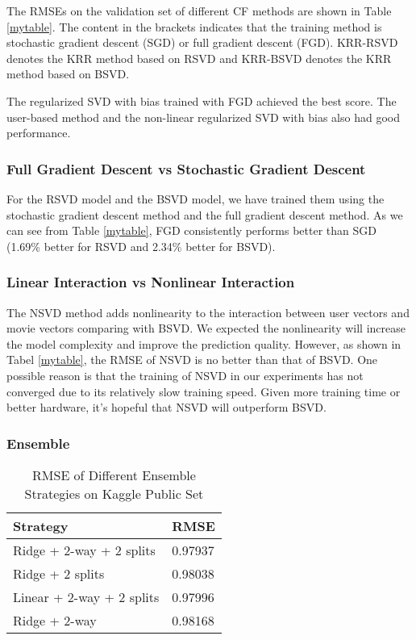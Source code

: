 \documentclass[10pt,conference,compsocconf]{IEEEtran}
\begin{document}
The RMSEs on the validation set of different CF methods are shown in Table \ref{mytable}. The content in the brackets indicates that the training method is stochastic gradient descent (SGD) or full gradient descent (FGD). KRR-RSVD denotes the KRR method based on RSVD and KRR-BSVD denotes the KRR method based on BSVD. 

The regularized SVD with bias trained with FGD achieved the best score. The user-based method and the non-linear regularized SVD with bias also had good performance.

\subsubsection{Full Gradient Descent vs Stochastic Gradient Descent}
For the RSVD model and the BSVD model, we have trained them using the stochastic gradient descent method and the full gradient descent method. As we can see from Table \ref{mytable}, FGD consistently performs better than SGD (1.69\% better for RSVD and 2.34\% better for BSVD).

\subsubsection{Linear Interaction vs Nonlinear Interaction}
The NSVD method adds nonlinearity to the interaction between user vectors and movie vectors comparing with BSVD. We expected the nonlinearity will increase the model complexity and improve the prediction quality. However, as shown in Tabel \ref{mytable}, the RMSE of NSVD is no better than that of BSVD. One possible reason is that the training of NSVD in our experiments has not converged due to its relatively slow training speed. Given more training time or better hardware, it's hopeful that NSVD will outperform BSVD.

\subsubsection{Ensemble}
\begin{table*}[htbp]
  \centering
  \begin{tabular}[c]{|l||l|}
    \hline
    Strategy&RMSE\\
    \hline
    Ridge + 2-way + 2 splits&0.97937\\
    Ridge + 2 splits&0.98038\\
    Linear + 2-way + 2 splits&0.97996\\
    Ridge + 2-way&0.98168\\
    \hline
  \end{tabular}
    \caption{  \label{ensembleTable} RMSE of Different Ensemble Strategies on Kaggle Public Set}
\end{table*}
\end{document}
